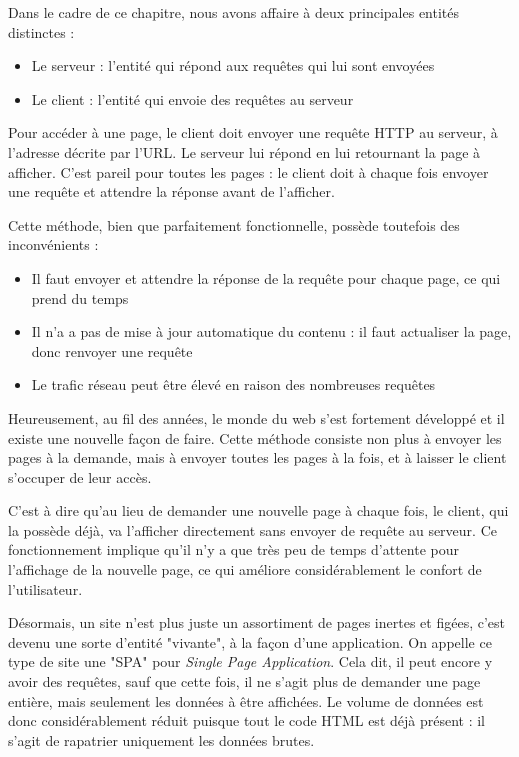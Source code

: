 \documentclass[
    iai, %
    eai, %
]{heig-tb}
\begin{document}
Dans le cadre de ce chapitre, nous avons affaire à deux principales entités distinctes :
\begin{itemize}
  \item Le serveur : l'entité qui répond aux requêtes qui lui sont envoyées
  \item Le client : l'entité qui envoie des requêtes au serveur
\end{itemize}
\bigskip

Pour accéder à une page, le client doit envoyer une requête HTTP au serveur, à l'adresse décrite par l'URL. Le serveur lui répond en lui retournant la page à afficher.
C'est pareil pour toutes les pages : le client doit à chaque fois envoyer une requête et attendre la réponse avant de l'afficher.


Cette méthode, bien que parfaitement fonctionnelle, possède toutefois des inconvénients :
\begin{itemize}
  \item Il faut envoyer et attendre la réponse de la requête pour chaque page, ce qui prend du temps
  \item Il n'a a pas de mise à jour automatique du contenu : il faut actualiser la page, donc renvoyer une requête
  \item Le trafic réseau peut être élevé en raison des nombreuses requêtes
\end{itemize}
\bigskip
Heureusement, au fil des années, le monde du web s'est fortement développé et il existe une nouvelle façon de faire.
Cette méthode consiste non plus à envoyer les pages à la demande, mais à envoyer toutes les pages à la fois, et à laisser le client s'occuper de leur accès.

\newpage
C'est à dire qu'au lieu de demander une nouvelle page à chaque fois, le client, qui la possède déjà, va l'afficher directement sans envoyer de requête au serveur.
Ce fonctionnement implique qu'il n'y a que très peu de temps d'attente pour l'affichage de la nouvelle page, ce qui améliore considérablement le confort de l'utilisateur.


Désormais, un site n'est plus juste un assortiment de pages inertes et figées, c'est devenu une sorte d'entité "vivante", à la façon d'une application.
On appelle ce type de site une "SPA" pour \emph{Single Page Application}.
Cela dit, il peut encore y avoir des requêtes, sauf que cette fois, il ne s'agit plus de demander une page entière, mais seulement les données à être affichées.
Le volume de données est donc considérablement réduit puisque tout le code HTML est déjà présent : il s'agit de rapatrier uniquement les données brutes.
\end{document}
